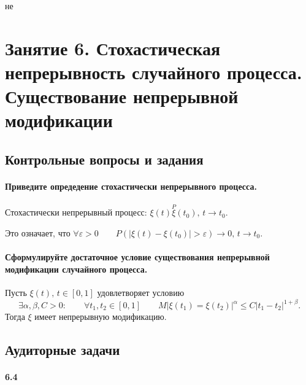 не 
\chapter*{Занятие 6. Стохастическая непрерывность случайного процесса.
          Существование непрерывной модификации}

\section*{Контрольные вопросы и задания}

\subsubsection*{Приведите опредедение стохастически непрерывного процесса.}

Стохастически непрерывный процесс:
$ \xi \left( t \right) \overset{P} \xi \left( t_0 \right), \, t \to t_0$.

Это означает, что
$ \forall \varepsilon > 0 \qquad
  P \left( \left| \xi \left( t \right) - \xi \left( t_0 \right) \right| > \varepsilon \right) \to 0,
  \, t \to t_0$.

\subsubsection*{Сформулируйте достаточное условие существования непрерывной модификации случайного
                процесса.}

Пусть $ \xi \left( t \right), \, t \in \left[ 0, 1 \right] $ удовлетворяет условию
$$ \exists \alpha, \beta, C > 0: \qquad
  \forall t_1, t_2 \in \left[ 0, 1 \right] \qquad
  M \left| \xi \left( t_1 \right) =
  \xi \left( t_2 \right) \right|^{ \alpha } \leq C \left| t_1 - t_2 \right|^{1 + \beta }.$$
Тогда $ \xi $ имеет непрерывную модификацию.

\section*{Аудиторные задачи}

\subsubsection*{6.4}

